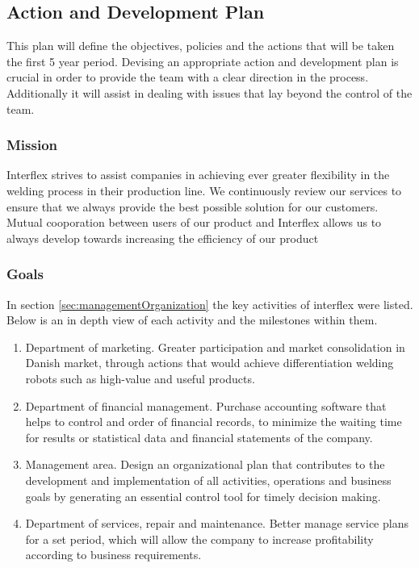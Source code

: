 \subsection{Action and Development Plan}
\label{sec:actionDevelopmentPlan}
This plan will define the objectives, policies and the actions that will be taken the first 5 year period.
Devising an appropriate action and development plan is crucial in order to provide the team with a clear direction in the process.
Additionally it will assist in dealing with issues that lay beyond the control of the team.


\subsubsection{Mission}
Interflex strives to assist companies in achieving ever greater flexibility in the welding process in their production line.
We continuously review our services to ensure that we always provide the best possible solution for our customers.
Mutual cooporation between users of our product and Interflex allows us to always develop towards increasing the efficiency of our product

\subsubsection{Goals}
In section \ref{sec:managementOrganization} the key activities of interflex were listed. Below is an in depth view of each activity and the milestones within them.
\begin{enumerate}
\item Department of marketing. 
      Greater participation and market consolidation in Danish market, through actions that would achieve differentiation welding robots such as high-value and useful products.
\item Department of financial management. 
      Purchase accounting software that helps to control and order of financial records, to minimize the waiting time for results or statistical data and financial statements of the company.
\item Management area. Design an organizational plan that contributes to the development and implementation of all activities, operations and business goals by generating an essential 	      control tool for timely decision making.
\item Department of services, repair and maintenance. Better manage service plans for a set period, which will allow the company to increase profitability according to business
      requirements.
\end{enumerate}


